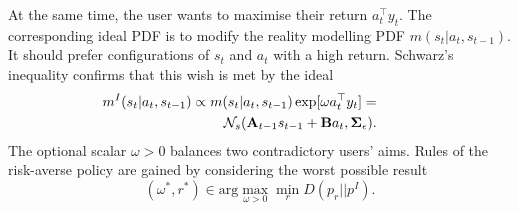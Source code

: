 At the same time, the user wants to maximise their return $a^{\top}_{t}y_{t}$. The corresponding ideal PDF is to modify the
reality modelling PDF $m(s_{t}|a_{t},s_{t-1})$. It should prefer configurations of $s_{t}$ and $a_{t}$ with a high return. Schwarz's inequality confirms that this wish is met by the ideal
\begin{eqnarray}
\nonumber
&&\hspace*{-9ex}m^I(s_{t}|a_{t},s_{t-1}) \propto m(s_{t}|a_{t},s_{t-1})\exp[\omega a^{\top}_{t}y_{t}]=\\
\nonumber
                  &&\hspace*{-9ex}\mathcal{N}_{s}(\mat{A}_{t-1}s_{t-1}+\mat{B}a_{t},\mat{\Sigma}_{\epsilon}).
\end{eqnarray}
The optional scalar $\omega > 0$ balances two contradictory users' aims. Rules of the risk-averse policy are gained by considering the worst possible result
\begin{equation}
    \label{e:idealbehaviourminomega}
 (\omega^{\ast},r^{\ast})\in \mathrm{arg}  \max_{\omega>0} \min_{r} D(p_{r}||p^{I}).
\end{equation}

